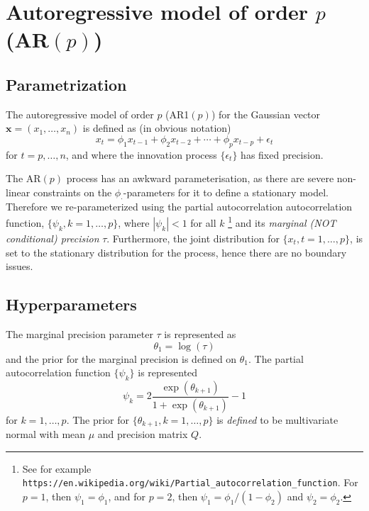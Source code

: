 \documentclass[a4paper,11pt]{article}
\begin{document}
\section*{Autoregressive model of order $p$ (AR$(p)$)}

\subsection*{Parametrization}

The autoregressive model of order $p$ (AR1$(p)$) for the Gaussian vector
$\mathbf{x}=(x_1,\dots,x_n)$ is defined as (in obvious notation)
\begin{displaymath}
    x_{t} = \phi_{1}x_{t-1} + \phi_{2}x_{t-2} + \cdots + \phi_{p}
    x_{t-p} + \epsilon_{t}
\end{displaymath}
for $t = p, \ldots, n$, and where the innovation process
$\{\epsilon_{t}\}$ has fixed precision.

The AR$(p)$ process has an awkward parameterisation, as there are
severe non-linear constraints on the $\phi_{\cdot}$-parameters for it
to define a stationary model. Therefore we re-parameterized using the
partial autocorrelation autocorrelation function,
$\{\psi_{k}, k=1, \ldots, p\}$, where $|\psi_{k}|< 1$ for all $k$
\footnote{See for example
    \texttt{https://en.wikipedia.org/wiki/Partial\_autocorrelation\_function}.
    For $p=1$, then $\psi_{1} = \phi_{1}$, and for $p=2$, then
    $\psi_{1} = \phi_{1}/(1-\phi_{2})$ and $\psi_{2} = \phi_{2}$.} and
its \emph{marginal (NOT conditional) precision} $\tau$. Furthermore,
the joint distribution for $\{x_{t}, t=1, \ldots, p\}$, is set to the
stationary distribution for the process, hence there are no boundary
issues.

\subsection*{Hyperparameters}

The marginal precision parameter $\tau$ is represented as
\begin{displaymath}
    \theta_1 =\log(\tau) 
\end{displaymath}
and the prior for the marginal precision is defined on
$\theta_{1}$. The partial autocorrelation function $\{\psi_{k}\}$ is
represented
\begin{displaymath}
    \psi_{k} = 2\frac{\exp(\theta_{k+1})}{1+\exp(\theta_{k+1})} -1
\end{displaymath}
for $k = 1, \ldots, p$. The prior for $\{\theta_{k+1}, k=1, \ldots,
p\}$ is \emph{defined} to be multivariate normal with mean $\mu$ and
precision matrix $Q$.
\end{document}
